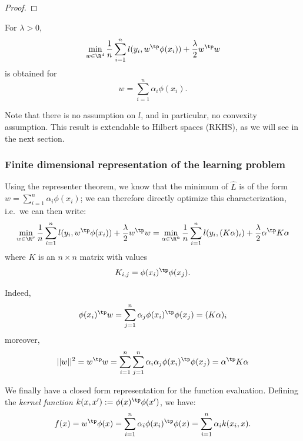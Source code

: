 \documentclass{../cs-classes/cs-classes}
\begin{document}
\begin{proof}
\end{proof}

\begin{corollary}
    For $\lambda>0$, 
    \begin{equation*}
        \min_{w\in\R^d} \frac{1}{n} \sum_{i=1}^n l(y_i, w^\tp\phi(x_i)) + \frac{\lambda}{2} w^\tp w
    \end{equation*}
    is obtained for
    \begin{equation*}
        w = \sum_{i=1}^n \alpha_i\phi(x_i).
    \end{equation*}
\end{corollary}

Note that there is no assumption on $l$, and in particular, no convexity assumption. This result is extendable to Hilbert spaces (RKHS), as we will see in the next section.

\subsubsection{Finite dimensional representation of the learning problem}
Using the representer theorem, we know that the minimum of $\hat{L}$ is of the form $w=\sum_{i=1}^n \alpha_i\phi(x_i)$; we can therefore directly optimize this characterization, i.e.~we can then write:
\begin{equation*}
    \min_{w\in\R^r} \frac{1}{n} \sum_{i=1}^n l(y_i, w^\tp\phi(x_i)) + \frac{\lambda}{2} w^\tp w = \min_{\alpha\in\R^n} \frac{1}{n}\sum_{i=1}^n l(y_i, (K\alpha)_i) + \frac{\lambda}{2}\alpha^\tp K\alpha
\end{equation*}
where $K$ is an $n\times n$ matrix with values
\begin{equation*}
    K_{i, j} = \phi(x_i)^\tp \phi(x_j).
\end{equation*}

Indeed,
\begin{equation*}
    \phi(x_i)^\tp w = \sum_{j=1}^n \alpha_j\phi(x_i)^\tp\phi(x_j) = (K\alpha)_i
\end{equation*}
moreover,
\begin{equation*}
    ||w||^2 = w^\tp w = \sum_{i=1}^n\sum_{j=1}^n \alpha_i\alpha_j\phi(x_i)^\tp\phi(x_j) = \alpha^\tp K\alpha
\end{equation*}

We finally have a closed form representation for the function evaluation. Defining the \emph{kernel function} $k(x, x'):=\phi(x)^\tp \phi(x')$, we have:
\begin{equation*}
    f(x) = w^\tp\phi(x) = \sum_{i=1}^n \alpha_i\phi(x_i)^\tp\phi(x) = \sum_{i=1}^n \alpha_i k(x_i, x).
\end{equation*}
\end{document}
